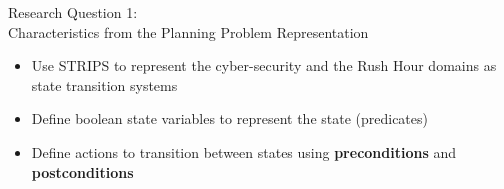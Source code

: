\begin{frame}{Research Question 1: \\Characteristics from the Planning Problem Representation}
	\begin{itemize}
	\item Use STRIPS to represent the cyber-security and the Rush Hour domains as state transition systems
	\item Define boolean state variables to represent the state (predicates)
	\item Define actions to transition between states using \textbf{preconditions} and \textbf{postconditions}
	\end{itemize}
	
\begin{figure}[!ht]
\noindent{}
\end{figure}

\end{frame}

